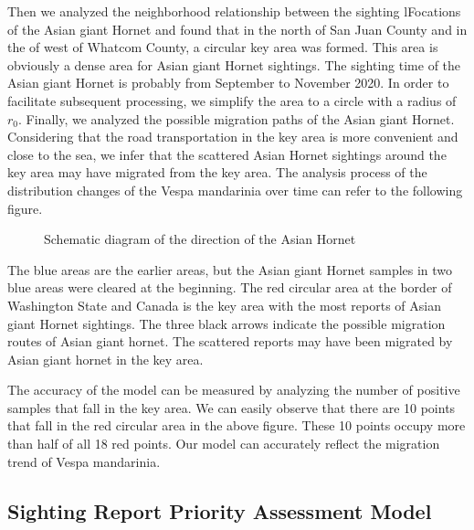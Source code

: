 \documentclass{mcmthesis}
\numberwithin{figure}{section}
\numberwithin{table}{section}
\begin{document}
Then we analyzed the neighborhood relationship between the sighting lFocations of the Asian giant Hornet and found that in the north of San Juan County and in the  of west of Whatcom County, a circular key area was formed. This area is obviously a dense area for Asian giant Hornet sightings. The sighting time of the Asian giant Hornet is probably from September to November 2020. In order to facilitate subsequent processing, we simplify the area to a circle with a radius of $r_0$. Finally, we analyzed the possible migration paths of the Asian giant Hornet. Considering that the road transportation in the key area is more convenient and close to the sea, we infer that the scattered Asian Hornet sightings around the key area may have migrated from the key area. The analysis process of the distribution changes of the Vespa mandarinia over time can refer to the following figure.



\begin{figure}[H]
  \caption{Schematic diagram of the direction of the Asian Hornet}\label{1_4}
\end{figure}

The blue areas are the earlier areas, but the Asian giant Hornet samples in two blue areas were cleared at the beginning. The red circular area at the border of  Washington State and Canada is the key area with the most reports of Asian giant Hornet sightings. The three black arrows indicate the possible migration routes of Asian giant hornet. The scattered reports may have been migrated by Asian giant hornet in the key area. 

The accuracy of the model can be measured by analyzing the number of positive samples that fall in the key area. We can easily observe that there are 10 points that fall in the red circular area in the above figure. These 10 points occupy more than half of all 18 red points. Our model can accurately reflect the migration trend of Vespa mandarinia.

\subsection{Sighting Report Priority Assessment Model}
\end{document}
